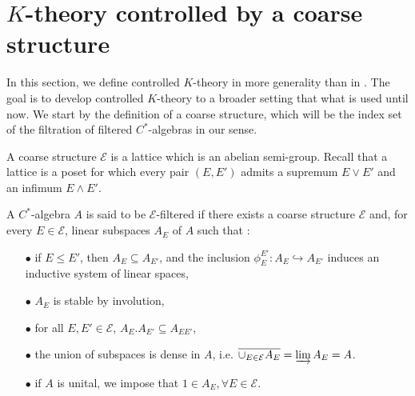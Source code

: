 \section{$K$-theory controlled by a coarse structure}

In this section, we define controlled $K$-theory in more generality than in \cite{OY2}. The goal is to develop controlled $K$-theory to a broader setting that what is used until now. We start by the definition of a coarse structure, which will be the index set of the filtration of filtered $C^*$-algebras in our sense.
 

\begin{definition}
A coarse structure $\mathcal E$ is a lattice which is an abelian semi-group. %
Recall that a lattice is a poset for which every pair $(E,E')$ admits a supremum $E\vee E'$ and an infimum $E\wedge E'$.
\end{definition}

\begin{definition}
A $C^*$-algebra $A$ is said to be $\mathcal E$-filtered if there exists a coarse structure $\mathcal E$ and, for every $E\in \mathcal E$, linear subspaces $A_E$ of $A$ such that :
\begin{itemize}
\item[$\bullet$] if $E \leq E'$, then $A_E\subseteq A_{E'}$, and the inclusion $\phi_E^{E'}: A_E\hookrightarrow A_{E'}$ induces an inductive system of linear spaces,
\item[$\bullet$] $A_E$ is stable by involution,
\item[$\bullet$] for all $E,E'\in\mathcal E$, $A_E.A_{E'}\subseteq A_{EE'}$,
\item[$\bullet$] the union of subspaces is dense in $A$, i.e. $\overline{\cup_{E\in\mathcal E}A_E} = \varinjlim A_E = A$.
\item[$\bullet$] if $A$ is unital, we impose that $1\in A_E,\forall E\in\mathcal E$.
\end{itemize}
\end{definition}


